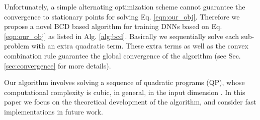 \documentclass{article}
\begin{document}
        Unfortunately, a simple alternating optimization scheme cannot guarantee the convergence to stationary points for solving Eq. \ref{eqn:our_obj}.  Therefore we propose a novel BCD based algorithm for training DNNs based on Eq. \ref{eqn:our_obj} as listed in Alg. \ref{alg:bcd}. Basically we sequentially solve each sub-problem with an extra quadratic term. These extra terms as well as the convex combination rule guarantee the global convergence of the algorithm (see Sec. \ref{sec:convergence} for more details). 

Our algorithm involves solving a sequence of quadratic programs (QP), whose computational complexity is cubic, in general, in the input dimension \cite{nesterov1994interior}. %
In this paper we focus on the theoretical development of the algorithm, and consider fast implementations in future work.%
\end{document}
